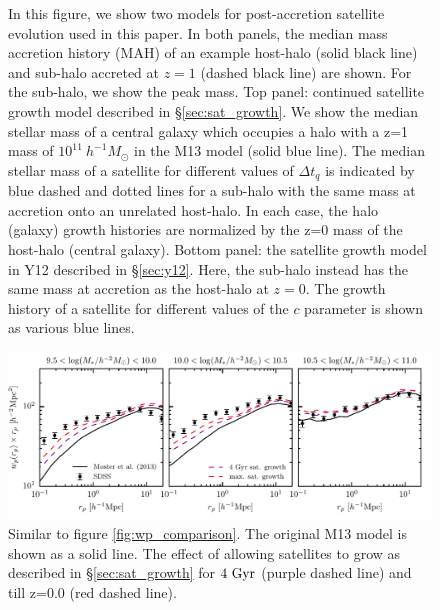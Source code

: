 \documentclass[a4paper,fleqn,usenatbib]{mnras}
\begin{document}
\begin{figure}
    \caption{In this figure, we show two models for post-accretion satellite evolution used in this paper.  In both panels, the median mass accretion history (MAH) of an example host-halo (solid black line) and sub-halo accreted at $z=1$ (dashed black line) are shown.  For the sub-halo, we show the peak mass.  Top panel: continued satellite growth model described in \S \ref{sec:sat_growth}.  We show the median stellar mass of a central galaxy which occupies a halo with a z=1 mass of $10^{11}~h^{-1}M_{\odot}$ in the M13 model (solid blue line).  The median stellar mass of a satellite for different values of $\Delta t_q$  is indicated by blue dashed and dotted lines for a sub-halo with the same mass at accretion onto an unrelated host-halo.  In each case, the halo (galaxy) growth histories are normalized by the z=0 mass of the host-halo (central galaxy).  Bottom panel: the satellite growth model in Y12 described in \S \ref{sec:y12}.  Here, the sub-halo instead has the same mass at accretion as the host-halo at $z=0$.  The growth history of a satellite for different values of the $c$ parameter is shown as various blue lines.}
    \label{fig:sat_growth_model}
\end{figure}

\begin{figure}
    \includegraphics{figures/wp_sat_growth_comparison.pdf}
    \caption{Similar to figure \ref{fig:wp_comparison}.  The original M13 model is shown as a solid line.  The effect of allowing satellites to grow as described in \S \ref{sec:sat_growth} for $4~{\rm Gyr}$ (purple dashed line) and till z=0.0 (red dashed line).}
    \label{fig:wp_effect_comparison_sat_growth}
\end{figure}
\end{document}
